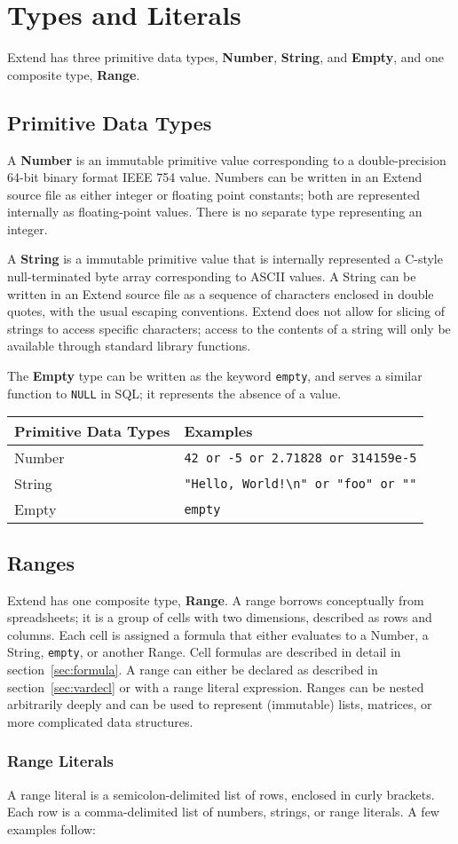 \section{Types and Literals}
		Extend has three primitive data types, \textbf{Number}, \textbf{String}, and \textbf{Empty}, and one composite type, \textbf{Range}.
	\subsection{Primitive Data Types}
		A \textbf{Number} is an immutable primitive value corresponding to a double-precision 64-bit binary format IEEE 754 value. Numbers can be written in an Extend source file as either integer or floating point constants; both are represented internally as floating-point values. There is no separate type representing an integer.

		A \textbf{String} is a immutable primitive value that is internally represented a C-style null-terminated byte array corresponding to ASCII values. A String can be written in an Extend source file as a sequence of characters enclosed in double quotes, with the usual escaping conventions. Extend does not allow for slicing of strings to access specific characters; access to the contents of a string will only be available through standard library functions.

		The \textbf{Empty} type can be written as the keyword \texttt{empty}, and serves a similar function to \texttt{NULL} in SQL; it represents the absence of a value.
		\newline
		\begin{table}[H]
		\centering
		\begin{tabular} {| l | l |}
			\hline
			\textbf{Primitive Data Types} & \textbf{Examples} \\ \hline
			Number & \texttt{42 or -5 or 2.71828 or 314159e-5} \\ \hline
			String & \texttt{"Hello, World!\textbackslash n" or "foo" or ""} \\ \hline
			Empty & \texttt{empty} \\ \hline
		\end{tabular}
		\end{table}
	\subsection{Ranges}
		Extend has one composite type, \textbf{Range}. A range borrows conceptually from spreadsheets; it is a group of cells with two dimensions, described as rows and columns. Each cell is assigned a formula that either evaluates to a Number, a String, \texttt{empty}, or another Range. Cell formulas are described in detail in section~\ref{sec:formula}. A range can either be declared as described in section~\ref{sec:vardecl} or with a range literal expression. Ranges can be nested arbitrarily deeply and can be used to represent (immutable) lists, matrices, or more complicated data structures.
\subsubsection{Range Literals}
		A range literal is a semicolon-delimited list of rows, enclosed in curly brackets. Each row is a comma-delimited list of numbers, strings, or range literals. A few examples follow:
		
